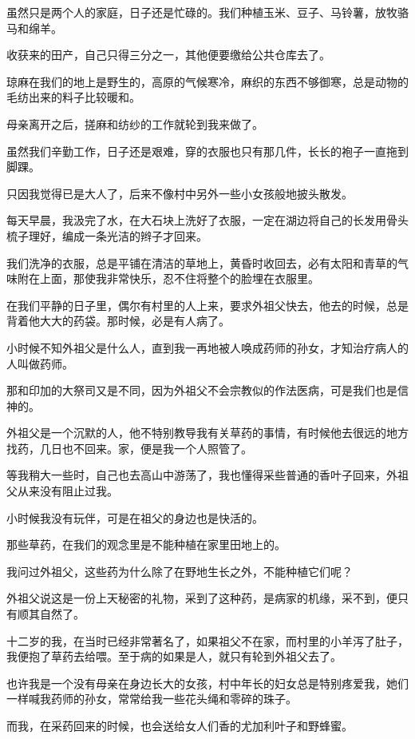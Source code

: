 \par 虽然只是两个人的家庭，日子还是忙碌的。我们种植玉米、豆子、马铃薯，放牧骆马和绵羊。
\par 收获来的田产，自己只得三分之一，其他便要缴给公共仓库去了。
\par 琼麻在我们的地上是野生的，高原的气候寒冷，麻织的东西不够御寒，总是动物的毛纺出来的料子比较暖和。
\par 母亲离开之后，搓麻和纺纱的工作就轮到我来做了。
\par 虽然我们辛勤工作，日子还是艰难，穿的衣服也只有那几件，长长的袍子一直拖到脚踝。
\par 只因我觉得已是大人了，后来不像村中另外一些小女孩般地披头散发。
\par 每天早晨，我汲完了水，在大石块上洗好了衣服，一定在湖边将自己的长发用骨头梳子理好，编成一条光洁的辫子才回来。
\par 我们洗净的衣服，总是平铺在清洁的草地上，黄昏时收回去，必有太阳和青草的气味附在上面，那使我非常快乐，忍不住将整个的脸埋在衣服里。
\par 在我们平静的日子里，偶尔有村里的人上来，要求外祖父快去，他去的时候，总是背着他大大的药袋。那时候，必是有人病了。
\par 小时候不知外祖父是什么人，直到我一再地被人唤成药师的孙女，才知治疗病人的人叫做药师。
\par 那和印加的大祭司又是不同，因为外祖父不会宗教似的作法医病，可是我们也是信神的。
\par 外祖父是一个沉默的人，他不特别教导我有关草药的事情，有时候他去很远的地方找药，几日也不回来。家，便是我一个人照管了。
\par 等我稍大一些时，自己也去高山中游荡了，我也懂得采些普通的香叶子回来，外祖父从来没有阻止过我。
\par 小时候我没有玩伴，可是在祖父的身边也是快活的。
\par 那些草药，在我们的观念里是不能种植在家里田地上的。
\par 我问过外祖父，这些药为什么除了在野地生长之外，不能种植它们呢？
\par 外祖父说这是一份上天秘密的礼物，采到了这种药，是病家的机缘，采不到，便只有顺其自然了。
\par 十二岁的我，在当时已经非常著名了，如果祖父不在家，而村里的小羊泻了肚子，我便抱了草药去给喂。至于病的如果是人，就只有轮到外祖父去了。
\par 也许我是一个没有母亲在身边长大的女孩，村中年长的妇女总是特别疼爱我，她们一样喊我药师的孙女，常常给我一些花头绳和零碎的珠子。
\par 而我，在采药回来的时候，也会送给女人们香的尤加利叶子和野蜂蜜。
